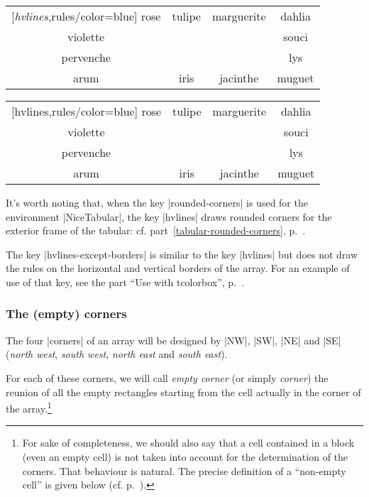 \documentclass[dvipsnames]{article}%
\begin{document}
\smallskip
\begin{Code}
\setlength{\arrayrulewidth}{1pt}
\begin{NiceTabular}{cccc}[\emph{hvlines},rules/color=blue]
rose      & tulipe & marguerite & dahlia \\
violette  &   & & souci \\
pervenche & & & lys \\
arum      & iris & jacinthe & muguet 
\end{NiceTabular}
\end{Code}

\begin{center}
\setlength{\arrayrulewidth}{1pt}
\begin{NiceTabular}{cccc}[hvlines,rules/color=blue]
rose      & tulipe & marguerite & dahlia \\
violette  &   & & souci \\
pervenche & & & lys \\
arum      & iris & jacinthe & muguet 
\end{NiceTabular}
\end{center}

\bigskip
It's worth noting that, when the key |rounded-corners| is used for the
environment |{NiceTabular}|, the key |hvlines| draws rounded corners for the
exterior frame of the tabular: cf. part~\ref{tabular-rounded-corners},
p.~\pageref{tabular-rounded-corners}.

\bigskip
The key |hvlines-except-borders| is similar to the key |hvlines| but does not
draw the rules on the horizontal and vertical borders of the array. For an
example of use of that key, see the part ``Use with tcolorbox'',
p.~\pageref{tcolorbox}. 

\subsubsection{The (empty) corners}

\label{corners}

The four |corners| of an array will be designed by |NW|, |SW|, |NE| and |SE|
(\emph{north west}, \emph{south west}, \emph{north east} and \emph{south east}).

For each of these corners, we will call \emph{empty corner} (or simply
\emph{corner}) the reunion of all the empty rectangles starting from the cell
actually in the corner of the array.\footnote{For sake of completeness, we
should also say that a cell contained in a block (even an empty cell) is not
taken into account for the determination of the corners. That behaviour is
natural. The precise definition of a ``non-empty cell'' is given below (cf.
p.~\pageref{empty-cells}).}
\end{document}
